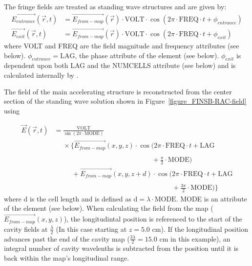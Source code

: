 The fringe fields are treated as standing wave structures and are given by:
\begin{equation*}
  \begin{aligned}
    \vec{E_{entrance}}(\vec{r}, t) &= \vec{E_{from-map}}(\vec{r}) \cdot \text{VOLT} \cdot \cos \left( 2\pi \cdot \text{FREQ} \cdot t
        + \phi_{entrance} \right) \\
    \vec{E_{exit}}(\vec{r}, t) &= \vec{E_{from-map}}(\vec{r}) \cdot \text{VOLT} \cdot \cos \left( 2\pi \cdot \text{FREQ} \cdot t
        + \phi_{exit} \right)
  \end{aligned}
\end{equation*}
where VOLT and FREQ are the field magnitude and frequency attributes (see below). 
$ \phi_{entrance}= \text{LAG}$, the phase attribute of the element (see below). $ \phi_{exit} $ is dependent upon both LAG and the NUMCELLS
attribute (see below) and is calculated internally by \opalt.

The field of the main accelerating structure is reconstructed from the center section of the standing wave solution shown in
Figure~\ref{figure_FINSB-RAC-field} using

\begin{equation*}
  \begin{split}
    \vec{E} ( \vec{r},t ) &= \frac{\text{VOLT}}{\sin (2 \pi \cdot \text{MODE})} \\
    &\phantom{=}
    \times \Biggl\{ \vec{E_{from-map}} (x,y,z) \cdot \cos \biggl( 2 \pi \cdot \text{FREQ} \cdot t + \text{LAG} \\
    &\phantom{= \times \Biggl\{ \vec{E_{from-map}} (x,y,z) \cdot \cos \biggl(}
    + \frac{\pi}{2} \cdot \text{MODE} \Bigr) \\
    &\phantom{= \times \Biggl\{}
    + \vec{E_{from-map}}(x,y,z+d) \cdot \cos \biggl( 2 \pi \cdot \text{FREQ} \cdot t + \text{LAG} \\
    &\phantom{= \times \Biggl\{ + \vec{E_{from-map}} (x,y,z+d) \cdot \cos \biggl(}
    + \frac{3 \pi}{2} \cdot \text{MODE} \Bigr) \Biggr\}
  \end{split}
\end{equation*}
where d is the cell length and is defined as $\text{d} = \lambda \cdot \text{MODE} $. MODE is an attribute of the element (see below).
When calculating the field from the map ($\vec{E_{from-map}}(x,y,z)$), the longitudintal position is referenced to the start of the cavity fields
at $\frac{\lambda}{2}$ (In this case starting at $z = 5.0 \text{ cm}$). If the longitudinal position advances past the end of the cavity map
($\frac{3\lambda}{2} = 15.0 \text{ cm}$ in this example), an integral number of cavity wavelenths is subtracted from the position until it is back
within the map's longitudinal range.

